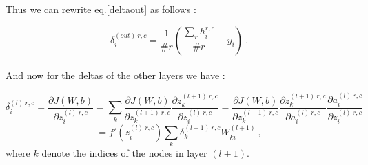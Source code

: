 \documentclass[a4paper,12pt,twoside]{article}
\begin{document}
Thus we can rewrite eq.\ref{deltaout} as follows : 

\begin{equation}
\delta^{(out)~r,c}_i = \frac{1}{\# r}\left(\frac{\sum_r h_i^{r,c}}{\# r} - y_i \right)~.
\end{equation}
\\

And now for the deltas of the other layers we have :

\begin{equation}
\delta^{(l)~r,c}_i = \frac{\partial J(W,b)}{\partial z^{(l)~r,c}_i} = \sum_k \frac{\partial J(W,b)}{\partial z^{(l+1)~r,c}_k}\frac{\partial z^{(l+1)~r,c}_k}{\partial z^{(l)~r,c}_i} = \frac{\partial J(W,b)}{\partial z^{(l+1)~r,c}_k}\frac{\partial z^{(l+1)~r,c}_k}{\partial a^{(l)~r,c}_i} \frac{\partial a^{(l)~r,c}_i}{\partial z^{(l)~r,c}_i} 
\end{equation}
\[
= f'(z^{(l)~r,c}_i) \sum_k \delta^{(l+1)~r,c}_k W^{(l+1)}_{ki}~,
\]
where $k$ denote the indices of the nodes in layer $(l+1)$.
\end{document}
